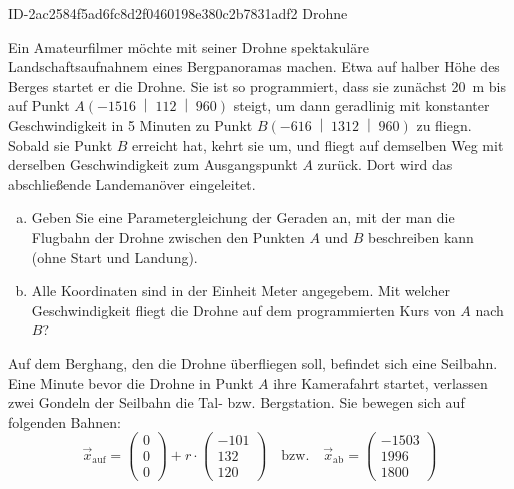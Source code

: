 \begin{exercise}
      {ID-2ac2584f5ad6fc8d2f0460198e380c2b7831adf2}
      {Drohne}
  \ifproblem\problem\par
    Ein Amateurfilmer möchte mit seiner Drohne spektakuläre Landschaftsaufnahnem
    eines Bergpanoramas machen. Etwa auf halber Höhe des Berges startet er
    die Drohne. Sie ist so programmiert, dass sie zunächst \SI{20}{\metre}
    bis auf Punkt
    $A\left(\num{-1516}\;\middle|\;\num{112}\;\middle|\;\num{960}\right)$
    steigt, um dann geradlinig mit konstanter Geschwindigkeit in
    \num{5} Minuten zu Punkt
    $B\left(\num{-616}\;\middle|\;\num{1312}\;\middle|\;\num{960}\right)$
    zu fliegn. Sobald sie Punkt $B$ erreicht hat, kehrt sie um, und fliegt auf
    demselben Weg mit derselben Geschwindigkeit zum Ausgangspunkt $A$ zurück.
    Dort wird das abschließende Landemanöver
    eingeleitet.
    \begin{enumerate}[a)]
      \item Geben Sie eine Parametergleichung
            der Geraden an, mit der man die
            Flugbahn der Drohne zwischen den
            Punkten $A$ und $B$ beschreiben kann
            (ohne Start und Landung).
      \item Alle Koordinaten sind in der Einheit
            Meter angegebem. Mit welcher Geschwindigkeit
            fliegt die Drohne auf dem programmierten Kurs
            von $A$ nach $B$?
    \end{enumerate}
    Auf dem Berghang, den die Drohne überfliegen soll,
    befindet sich eine Seilbahn.
    Eine Minute bevor die Drohne in Punkt $A$
    ihre Kamerafahrt startet, verlassen zwei Gondeln der
    Seilbahn die Tal- bzw. Bergstation.
    Sie bewegen sich auf folgenden Bahnen:
    \begin{equation*}
      \vec{x}_{\text{auf}}=
      \begin{pmatrix}\num{0}\\\num{0}\\\num{0}\end{pmatrix}
      +r\cdot
      \begin{pmatrix}\num{-101}\\\num{132}\\\num{120}\end{pmatrix}
      \quad\text{bzw.}\quad
      \vec x_{\text{ab}}=
      \begin{pmatrix}\num{-1503}\\\num{1996}\\\num{1800}\end{pmatrix}

\end{equation*}
\end{exercise}
